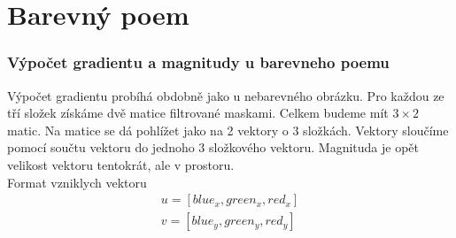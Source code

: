 \documentclass{report}
\begin{document}
\chapter{Barevný poem}

\subsection{Výpočet gradientu a magnitudy u barevneho poemu}
Výpočet gradientu probíhá obdobně jako u nebarevného obrázku. Pro každou ze tří složek získáme dvě matice filtrované maskami. Celkem budeme mít $3 \times 2$ matic. Na matice se dá pohlížet jako na 2 vektory o 3 složkách. Vektory sloučíme pomocí součtu vektoru do jednoho 3 složkového vektoru. Magnituda je opět velikost vektoru tentokrát, ale v prostoru. \\

Format vzniklych vektoru
\begin{align} 
	\label{bgr_vektory} 
		    u = [ blue_x, green_x, red_x ] \\ 
		    v = [ blue_y, green_y, red_y ] 
\end{align}
\end{document}
